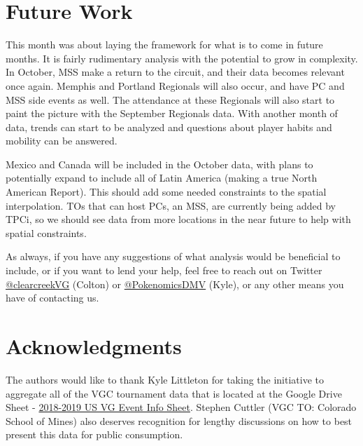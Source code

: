 \documentclass[11pt,twocolumn]{article}
\begin{document}
\section*{Future Work}

This month was about laying the framework for what is to come in future months. It is fairly rudimentary analysis with the potential to grow in complexity. In October, MSS make a return to the circuit, and their data becomes relevant once again. Memphis and Portland Regionals will also occur, and have PC and MSS side events as well. The attendance at these Regionals will also start to paint the picture with the September Regionals data. With another month of data, trends can start to be analyzed and questions about player habits and mobility can be answered. 

Mexico and Canada will be included in the October data, with plans to potentially expand to include all of Latin America (making a true North American Report). This should add some needed constraints to the spatial interpolation. TOs that can host PCs, an MSS, are currently being added by TPCi, so we should see data from more locations in the near future to help with spatial constraints. 

As always, if you have any suggestions of what analysis would be beneficial to include, or if you want to lend your help, feel free to reach out on Twitter \href{https://twitter.com/clearcreekVG}{@clearcreekVG} (Colton) or \href{https://twitter.com/PokenomicsDMV}{@PokenomicsDMV} (Kyle), or any other means you have of contacting us. 

\section*{Acknowledgments}

The authors would like to thank Kyle Littleton for taking the initiative to aggregate all of the VGC tournament data that is located at the Google Drive Sheet - \href{https://docs.google.com/spreadsheets/d/1ma2g3MTRTx3fUCun9awvshfAFoD9gRbB7rpf7qXve-k/edit?usp=sharing}{2018-2019 US VG Event Info Sheet}. Stephen Cuttler (VGC TO: Colorado School of Mines) also deserves recognition for lengthy discussions on how to best present this data for public consumption.
\end{document}

